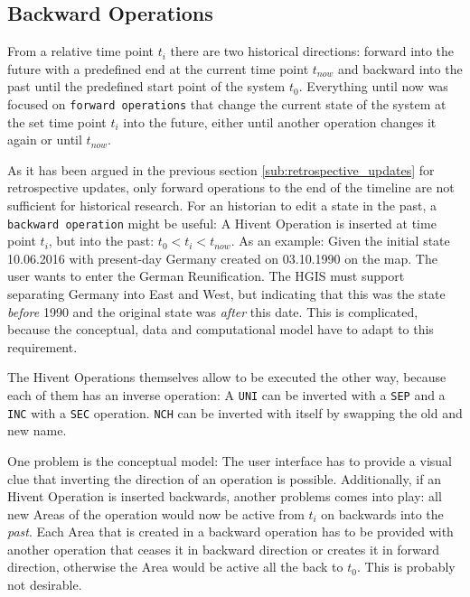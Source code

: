 
\subsection{Backward Operations} %
\label{sub:backward_operations}

From a relative time point $t_i$ there are two historical directions: forward into the future with a predefined end at the current time point $t_{now}$ and backward into the past until the predefined start point of the system $t_0$. Everything until now was focused on \texttt{forward operations} that change the current state of the system at the set time point $t_i$ into the future, either until another operation changes it again or until $t_{now}$.

As it has been argued in the previous section \ref{sub:retrospective_updates} for retrospective updates, only forward operations to the end of the timeline are not sufficient for historical research. For an historian to edit a state in the past, a \texttt{backward operation} might be useful: A Hivent Operation is inserted at time point $t_i$, but into the past: $ t_0 < t_i < t_{now}$. As an example: Given the initial state 10.06.2016 with present-day Germany created on 03.10.1990 on the map. The user wants to enter the German Reunification. The HGIS must support separating Germany into East and West, but indicating that this was the state \emph{before} 1990 and the original state was \emph{after} this date. This is complicated, because the conceptual, data and computational model have to adapt to this requirement.

The Hivent Operations themselves allow to be executed the other way, because each of them has an inverse operation: A \texttt{UNI} can be inverted with a \texttt{SEP} and a \texttt{INC} with a \texttt{SEC} operation. \texttt{NCH} can be inverted with itself by swapping the old and new name.

One problem is the conceptual model: The user interface has to provide a visual clue that inverting the direction of an operation is possible. Additionally, if an Hivent Operation is inserted backwards, another problems comes into play: all new Areas of the operation would now be active from $t_i$ on backwards into the \emph{past}. Each Area that is created in a backward operation has to be provided with another operation that ceases it in backward direction or creates it in forward direction, otherwise the Area would be active all the back to $t_0$. This is probably not desirable.



